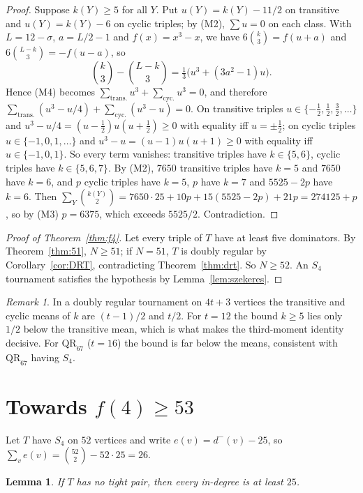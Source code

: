 \documentclass[11pt]{amsart}
\newtheorem{lemma}[theorem]{Lemma}
\theoremstyle{definition}
\theoremstyle{remark}
\newtheorem{remark}[theorem]{Remark}
\newcommand{\din}{d^{-}}
\newcommand{\QR}{\mathrm{QR}}
\begin{document}
\begin{proof}
Suppose $k(Y)\ge5$ for all $Y$. Put $u(Y)=k(Y)-11/2$ on transitive and $u(Y)=k(Y)-6$ on cyclic triples; by (M2), $\sum u=0$ on each
class. With $L=12-\sigma$, $a=L/2-1$ and $f(x)=x^3-x$, we have $6\binom k3=f(u+a)$ and $6\binom{L-k}3=-f(u-a)$, so
\[
  \binom k3-\binom{L-k}3=\tfrac13\bigl(u^3+(3a^2-1)u\bigr).
\]
Hence (M4) becomes $\sum_{\text{trans.}}u^3+\sum_{\text{cyc.}}u^3=0$, and therefore
$\sum_{\text{trans.}}(u^3-u/4)+\sum_{\text{cyc.}}(u^3-u)=0$. On transitive triples $u\in\{-\frac12,\frac12,\frac32,\dots\}$ and
$u^3-u/4=(u-\frac12)u(u+\frac12)\ge0$ with equality iff $u=\pm\frac12$; on cyclic triples $u\in\{-1,0,1,\dots\}$ and
$u^3-u=(u-1)u(u+1)\ge0$ with equality iff $u\in\{-1,0,1\}$. So every term vanishes: transitive triples have $k\in\{5,6\}$, cyclic
triples have $k\in\{5,6,7\}$. By (M2), $7650$ transitive triples have $k=5$ and $7650$ have $k=6$, and $p$ cyclic triples have $k=5$,
$p$ have $k=7$ and $5525-2p$ have $k=6$. Then $\sum_Y\binom{k(Y)}2=7650\cdot25+10p+15(5525-2p)+21p=274125+p$, so by (M3) $p=6375$,
which exceeds $5525/2$. Contradiction.
\end{proof}

\begin{proof}[Proof of Theorem~\ref{thm:f4}]
Let every triple of $T$ have at least five dominators. By Theorem~\ref{thm:51}, $N\ge51$; if $N=51$, $T$ is doubly regular by
Corollary~\ref{cor:DRT}, contradicting Theorem~\ref{thm:drt}. So $N\ge52$. An $S_4$ tournament satisfies the hypothesis by
Lemma~\ref{lem:szekeres}.
\end{proof}

\begin{remark}
In a doubly regular tournament on $4t+3$ vertices the transitive and cyclic means of $k$ are $(t-1)/2$ and $t/2$. For $t=12$ the
bound $k\ge5$ lies only $1/2$ below the transitive mean, which is what makes the third-moment identity decisive. For $\QR_{67}$
($t=16$) the bound is far below the means, consistent with $\QR_{67}$ having $S_4$.
\end{remark}

\section{\texorpdfstring{Towards $f(4)\ge53$}{Towards f(4) >= 53}}\label{sec:52}

Let $T$ have $S_4$ on $52$ vertices and write $e(v)=\din(v)-25$, so $\sum_ve(v)=\binom{52}2-52\cdot25=26$.

\begin{lemma}\label{lem:caseA}
If $T$ has no tight pair, then every in-degree is at least $25$.
\end{lemma}
\end{document}
